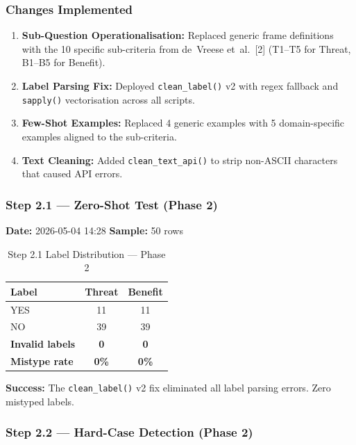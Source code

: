 \subsubsection{Changes Implemented}

\begin{enumerate}
    \item \textbf{Sub-Question Operationalisation:} Replaced generic frame definitions with the 10 specific sub-criteria from de~Vreese et~al.~[2] (T1--T5 for Threat, B1--B5 for Benefit).
    
    \item \textbf{Label Parsing Fix:} Deployed \texttt{clean\_label()} v2 with regex fallback and \texttt{sapply()} vectorisation across all scripts.
    
    \item \textbf{Few-Shot Examples:} Replaced 4 generic examples with 5 domain-specific examples aligned to the sub-criteria.
    
    \item \textbf{Text Cleaning:} Added \texttt{clean\_text\_api()} to strip non-ASCII characters that caused API errors.
\end{enumerate}

\subsubsection{Step 2.1 --- Zero-Shot Test (Phase 2)}
\label{sec:step21_phase2}

\textbf{Date:} 2026-05-04 14:28 \quad \textbf{Sample:} 50 rows

\begin{table}[H]
\centering
\caption{Step 2.1 Label Distribution --- Phase 2}
\begin{tabular}{@{}lcc@{}}
\toprule
\textbf{Label} & \textbf{Threat} & \textbf{Benefit} \\
\midrule
YES & 11 & 11 \\
NO  & 39 & 39 \\
\midrule
\textbf{Invalid labels} & \textbf{0} & \textbf{0} \\
\textbf{Mistype rate}   & \textbf{0\%} & \textbf{0\%} \\
\bottomrule
\end{tabular}
\end{table}

\textbf{Success:} The \texttt{clean\_label()} v2 fix eliminated all label parsing errors. Zero mistyped labels.

\subsubsection{Step 2.2 --- Hard-Case Detection (Phase 2)}
\label{sec:step22_phase2}

